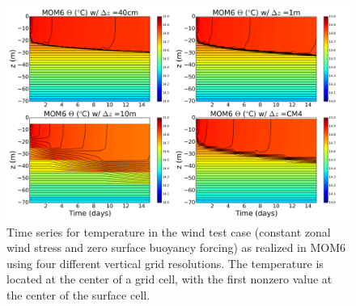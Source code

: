 \begin{figure}[h!t]
\begin{center}
\includegraphics[angle=0,width=14cm]{./figs/MOM6/wind_only_KPP_MOM6_temp.png}
\caption[Temperature from MOM6 for winds-alone test]{\sf Time series
  for temperature in the wind test case (constant zonal wind stress
  and zero surface buoyancy forcing) as realized in MOM6 using four
  different vertical grid resolutions.  The temperature is located at
  the center of a grid cell, with the first nonzero value at the
  center of the surface cell.}
\label{fig:MOM6_temp-wind_alone}
\end{center}
\end{figure}


